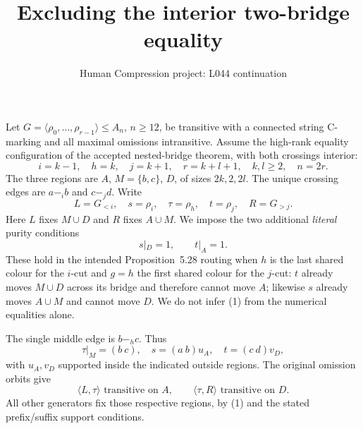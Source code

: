 \documentclass[11pt,a4paper]{article}
\title{Excluding the interior two-bridge equality}
\author{Human Compression project: L044 continuation}
\date{}
\newcommand{\gen}[1]{\langle#1\rangle}
\begin{document}
\maketitle
Let $G=\gen{\rho_0,\ldots,\rho_{r-1}}\leq A_n$, $n\geq12$,
be transitive with a connected string C-marking and all maximal
omissions intransitive. Assume the high-rank equality configuration
of the accepted nested-bridge theorem, with both crossings interior:
\[
 i=k-1,\quad h=k,\quad j=k+1,\quad
 r=k+l+1,\quad k,l\geq2,\quad n=2r.
\]
The three regions are $A$, $M=\{b,c\}$, $D$, of sizes $2k,2,2l$.
The unique crossing edges are $a\mathrel{-_i}b$ and
$c\mathrel{-_j}d$. Write
\[
 L=G_{<i},\quad s=\rho_i,\quad \tau=\rho_h,
 \quad t=\rho_j,\quad R=G_{>j}.
\]
Here $L$ fixes $M\cup D$ and $R$ fixes $A\cup M$.
We impose the two additional \emph{literal} purity conditions
\[
                         s|_D=1,\qquad t|_A=1.          \tag{1}
\]
These hold in the intended Proposition~5.28 routing when $h$ is
the last shared colour for the $i$-cut and $g=h$ the first shared
colour for the $j$-cut: $t$ already moves $M\cup D$ across its
bridge and therefore cannot move $A$; likewise $s$ already moves
$A\cup M$ and cannot move $D$. We do not infer (1) from the
numerical equalities alone.

The single middle edge is $b\mathrel{-_h}c$. Thus
\[
 \tau|_M=(b\ c),\quad s=(a\ b)u_A,\quad t=(c\ d)v_D,
\]
with $u_A,v_D$ supported inside the indicated outside regions.
The original omission orbits give
\[
              \gen{L,\tau}\text{ transitive on }A,
 \qquad       \gen{\tau,R}\text{ transitive on }D.       \tag{2}
\]
All other generators fix those respective regions, by (1) and
the stated prefix/suffix support conditions.
\end{document}
